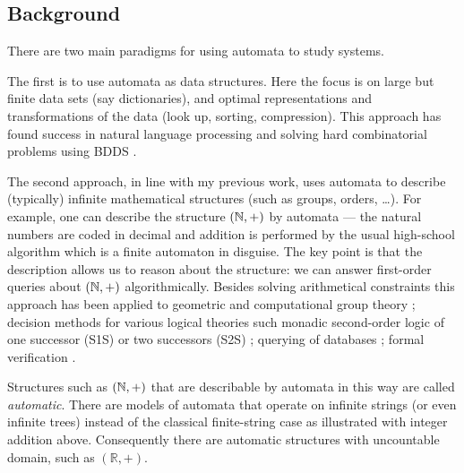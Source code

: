 \documentclass[12pt]{article}
\theoremstyle{plain} \numberwithin{equation}{section}
\theoremstyle{definition}
\def\tit#1{\subsection*{#1}}
\begin{document}

\tit{Background}

There are two main paradigms for using automata to study systems. 

The first is to use automata as data structures. Here the focus is on large but finite data sets (say dictionaries), and optimal representations and transformations of the data (look up, sorting, compression). This approach has found success in natural language processing \cite{mpr07} and solving hard combinatorial problems using BDDS \cite{Brya86}.

The second approach, in line with my previous work, uses automata to describe (typically) infinite mathematical structures (such as groups, orders, \dots). For example, one can describe the structure $({\mathbb N},+)$ by automata --- the natural numbers are coded in decimal and addition is performed by the usual high-school algorithm which is a finite automaton in disguise. The key point is that the description allows us to reason about the structure: we can answer first-order queries about $({\mathbb N},+)$ algorithmically. Besides solving arithmetical constraints  this approach has been applied to
geometric and computational group theory \cite{CEHLPT92}; decision methods for various logical theories such monadic second-order logic of one successor (S1S) or two successors (S2S) \cite{Buch60, Rabi69}; querying of databases \cite{BeLi02}; formal verification \cite{VaWo94}.

Structures such as $({\mathbb N},+)$ that are describable by automata in this way are called {\em automatic}. There are models of automata that operate on infinite strings (or even infinite trees) instead of the classical finite-string case as illustrated with integer addition above. Consequently there are automatic structures with uncountable domain, such as $(\mathbb{R},+)$. 

\end{document}
